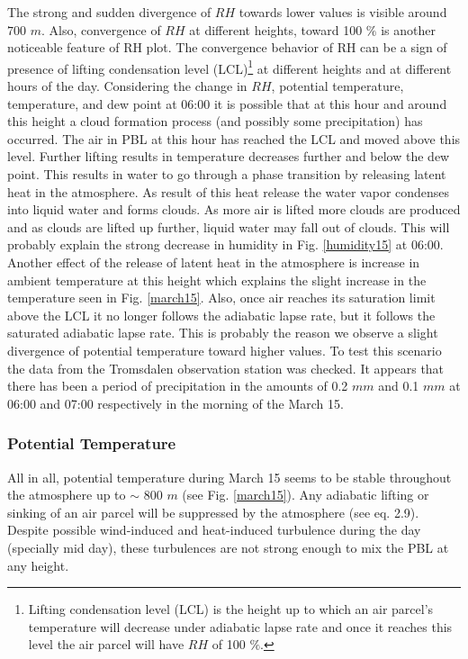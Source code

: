 \documentclass[a4paper,12pt]{article}
\numberwithin{equation}{section} %
\begin{document}
The strong and sudden divergence of $RH$ towards lower values is visible around $700$ $m$. Also, convergence of $RH$ at different heights, toward 100 $\%$ is another noticeable feature of RH plot. The convergence behavior of RH can be a sign of presence of lifting condensation level (LCL)\footnote{Lifting condensation level (LCL) is the height up to which an air parcel's temperature will decrease under adiabatic lapse rate and once it reaches this level the air parcel will have $RH$ of 100 $\%$.} at different heights and at different hours of the day. Considering the change in $RH$, potential temperature, temperature, and dew point at 06:00 it is possible that at this hour and around this height a cloud formation process (and possibly some precipitation) has occurred. The air in PBL at this hour has reached the LCL and moved above this level. Further lifting results in temperature decreases further and below the dew point. This results in water to go through a phase transition by releasing latent heat in the atmosphere. As result of this heat release the water vapor condenses into liquid water and forms clouds. As more air is lifted more clouds are produced and as clouds are lifted up further, liquid water may fall out of clouds. This will probably explain the strong decrease in humidity in Fig. \ref{humidity15} at 06:00. Another effect of the release of latent heat in the atmosphere is increase in ambient temperature at this height which explains the slight increase in the temperature seen in Fig. \ref{march15}. Also, once air reaches its saturation limit above the LCL it no longer follows the adiabatic lapse rate, but it follows the saturated adiabatic lapse rate. This is probably the reason we observe a slight divergence of potential temperature toward higher values. To test this scenario the data from the Tromsdalen observation station was checked. It appears that there has been a period of precipitation in the amounts of 0.2 $mm$ and 0.1 $mm$ at 06:00 and 07:00 respectively in the morning of the March 15.
 
\subsubsection{Potential Temperature}

All in all, potential temperature during March 15 seems to be stable throughout the atmosphere up to $\sim$ 800 $m$ (see Fig. \ref{march15}). Any adiabatic lifting or sinking of an air parcel will be suppressed by the atmosphere (see eq. 2.9). Despite possible wind-induced and heat-induced turbulence during the day (specially mid day), these turbulences are not strong enough to mix the PBL at any height.
\end{document}
